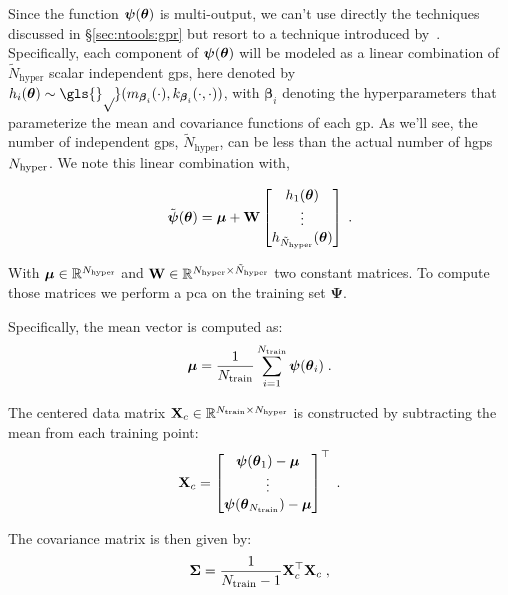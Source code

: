 \smallskip
Since the function $\boldsymbol{\psi}(\boldsymbol{\theta})$ is multi-output, we can't use directly the techniques discussed in \S\ref{sec:ntools:gpr} but resort to a technique introduced by~\cite{wilkinson2010}. Specifically, each component of $\boldsymbol{\psi}(\boldsymbol{\theta})$ will be modeled as a linear combination of $\tilde{N}_{\mathrm{hyper}}$ scalar independent \glspl{gp}, here denoted by $h_i(\btheta) \sim \mathcal{\gls{gp}}(m_{\boldsymbol{\beta}_i}(\cdot), k_{\boldsymbol{\beta}_i}(\cdot, \cdot))$, with $\boldsymbol{\beta}_i$ denoting the hyperparameters that parameterize the mean and covariance functions of each \gls{gp}. As we'll see, the number of independent \glspl{gp}, $\tilde{N}_{\mathrm{hyper}}$, can be less than the actual number of \glspl{hgp} $N_{\mathrm{hyper}}$. We note this linear combination with,

\begin{equation}
  \tilde{\boldsymbol{\psi}}(\boldsymbol{\theta}) = \boldsymbol{\mu} + \mathbf{W} \begin{bmatrix} h_1(\boldsymbol{\theta}) \\ \vdots \\ h_{\tilde{N}_{\mathrm{hyper}}}(\boldsymbol{\theta}) \end{bmatrix} \;.
  \label{eq:multiout}
\end{equation}

With $\boldsymbol{\mu} \in \mathbb{R}^{N_{\mathrm{hyper}}}$ and $\mathbf{W} \in \mathbb{R}^{N_{\mathrm{hyper}} \times \tilde{N}_{\mathrm{hyper}}}$ two constant matrices. To compute those matrices we perform a \gls{pca} on the training set $\boldsymbol{\Psi}$. 

\smallskip
Specifically, the mean vector is computed as:
\begin{equation}
  \boldsymbol{\mu} = \frac{1}{N_{\mathrm{train}}} \displaystyle\sum_{i=1}^{N_{\mathrm{train}}} \boldsymbol{\psi}(\boldsymbol{\theta}_i) \;.
  \label{eq:pca_mean}
\end{equation}

The centered data matrix $\mathbf{X}_c \in \mathbb{R}^{N_{\mathrm{train}} \times N_{\mathrm{hyper}}}$ is constructed by subtracting the mean from each training point:
\begin{equation}
  \mathbf{X}_c = \begin{bmatrix} \boldsymbol{\psi}(\boldsymbol{\theta}_1) - \boldsymbol{\mu} \\ \vdots \\ \boldsymbol{\psi}(\boldsymbol{\theta}_{N_{\mathrm{train}}}) - \boldsymbol{\mu} \end{bmatrix}^{\top} \;.
  \label{eq:pca_centered}
\end{equation}

The covariance matrix is then given by:
\begin{equation}
  \boldsymbol{\Sigma} = \frac{1}{N_{\mathrm{train}} - 1} \mathbf{X}_c^{\top} \mathbf{X}_c \;,
  \label{eq:pca_cov}
\end{equation}


